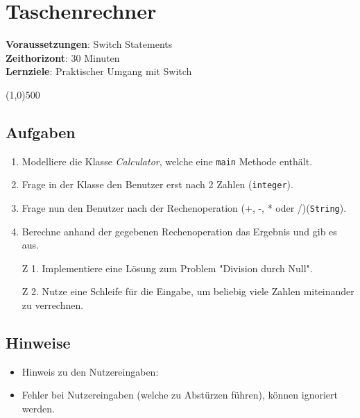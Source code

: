 

\chapter*{Taschenrechner}

\headingfont
\parbox {\textwidth}{
    \textbf{Voraussetzungen}: Switch Statements \\
    \textbf{Zeithorizont}: 30 Minuten \\
    \textbf{Lernziele}: Praktischer Umgang mit Switch
}

\normalfont
\begin{center}
\line(1,0){500}
\end{center}
\vspace{1cm}

\section*{Aufgaben}
\begin{enumerate}
     \item Modelliere die Klasse \textit{Calculator}, welche eine \texttt{main} Methode enthält.
     \item Frage in der Klasse den Benutzer erst nach 2 Zahlen (\texttt{integer}).
     \item Frage nun den Benutzer nach der Rechenoperation (+, -, * oder /)(\texttt{String}).
     \item Berechne anhand der gegebenen Rechenoperation das Ergebnis und gib es aus.
     \item [Z 1.] Implementiere eine Lösung zum Problem "Division durch Null".
     \item [Z 2.] Nutze eine Schleife für die Eingabe, um beliebig viele Zahlen miteinander zu verrechnen.
\end{enumerate}

\section*{Hinweise}
\begin{itemize}
    \item Hinweis zu den Nutzereingaben: 
    \item Fehler bei Nutzereingaben (welche zu Abstürzen führen), können ignoriert werden.
\end{itemize}

